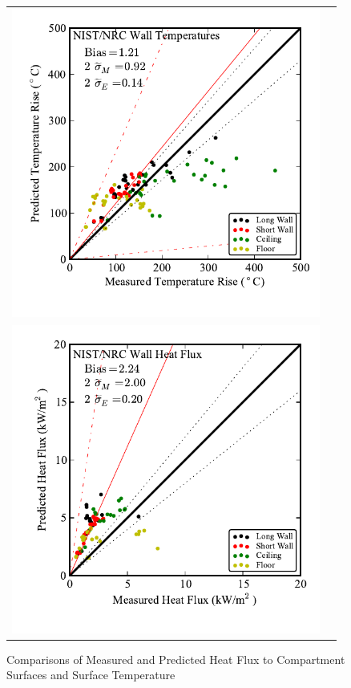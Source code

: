 \begin{figure}
\begin{center}
\begin{tabular}{lr}
\includegraphics[width=4in]{FIGURES/ScatterPlots/Wall_Temperature} & \\ 
\includegraphics[width=4in]{FIGURES/ScatterPlots/NIST_NRC_Wall_Heat_Flux} 
\end{tabular}
\end{center}
\caption{Comparisons of Measured and Predicted Heat Flux to Compartment Surfaces and Surface Temperature} \label{fig:Surface_Scatter}
\end{figure}

